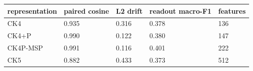 \begin{tabular}{@{}p{}p{}p{}p{}p{}@{}}
\toprule
\textbf{representation} & \textbf{paired cosine} & \textbf{L2 drift} & \textbf{readout macro-F1} & \textbf{features} \\
\midrule
CK4 & 0.935 & 0.316 & 0.378 & 136 \\
CK4+P & 0.990 & 0.122 & 0.380 & 147 \\
CK4P-MSP & 0.991 & 0.116 & 0.401 & 222 \\
CK5 & 0.882 & 0.433 & 0.373 & 512 \\
\bottomrule
\end{tabular}
